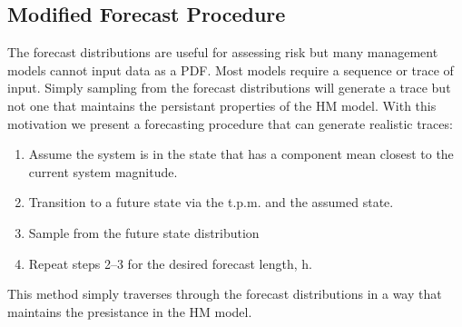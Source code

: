 \documentclass[wrr]{AGUTeX}
\begin{document}
\begin{article}
\subsection{Modified Forecast Procedure}

The forecast distributions are useful for assessing risk but many management models cannot input data as a PDF.  Most models require a sequence or trace of input.  Simply sampling from the forecast distributions will generate a trace but not one that maintains the persistant properties of the HM model.  With this motivation we present a forecasting procedure that can generate realistic traces:

\begin{enumerate}
\item Assume the system is in the state that has a component mean closest to the current system magnitude. 
\item Transition to a future state via the t.p.m. and the assumed state.
\item Sample from the future state distribution
\item Repeat steps 2--3 for the desired forecast length, h.
\end{enumerate}

This method simply traverses through the forecast distributions in a way that maintains the presistance in the HM model. 




\end{article}
\end{document}
